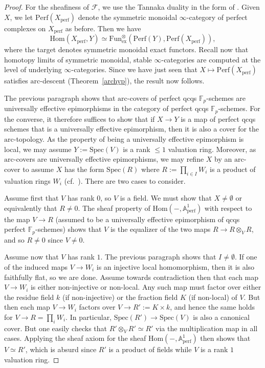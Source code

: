\documentclass[reqno]{amsart}
\newcommand{\sF}{\mathcal{F}}
\newcommand{\spec}{\mathrm{Spec}}
\newcommand{\arc}{\mathrm{arc}}
\renewcommand{\hom}{\mathrm{Hom}}
\theoremstyle{definition}
\begin{document}
\begin{proof} 
\newcommand{\perf}{\mathrm{Perf}}
\newcommand{\fun}{\mathrm{Fun}}
For the sheafiness of $\sF$, we use the Tannaka duality in the form of \cite[Theorem 1.5]{B}. Given $X$, we let $\perf(X_{\mathrm{perf}})$ denote the symmetric monoidal $\infty$-category of perfect complexes on $X_{\mathrm{perf}}$ as before. Then  we have  
\[ \hom( X_{\mathrm{perf}}, Y) \simeq \fun^{\otimes}_{\mathrm{ex}}(\perf(Y), \perf(X_{\mathrm{perf}})),  \]
where the target denotes symmetric monoidal exact functors.  
Recall now that homotopy limits of symmetric monoidal, stable $\infty$-categories
are computed at the level of underlying $\infty$-categories. 
Since we have just
seen that $X \mapsto \perf(X_{\mathrm{perf}})$ satisfies $\arc$-descent
(Theorem~\ref{archyp}),  the result now follows. 


The previous paragraph shows that $\arc$-covers of perfect qcqs
$\mathbb{F}_p$-schemes are universally effective epimorphisms 
in the category of perfect qcqs $\mathbb{F}_p$-schemes. For the converse,
it therefore suffices to show that if $X \to Y$ is a map of perfect qcqs schemes
that is a universally effective epimorphism, then it is also a cover for the
$\arc$-topology. As the property of being a universally effective epimorphism is
local, we may assume $Y := \mathrm{Spec}(V)$ is a rank $\leq 1$ valuation ring.
Moreover, as $\arc$-covers are universally effective epimorphisms, we may 
refine $X$ by an $\arc$-cover to assume $X$ has the form $\mathrm{Spec}(R)$
where $R := \prod_{i \in I} W_i$  is a product of  valuation rings
$W_i$ (cf.~). 
There are two cases to consider. 

Assume first that $V$ has rank $0$, so $V$ is a field. We must show that $X \neq
\emptyset$ or equivalently that $R \neq 0$. The sheaf property of
$\mathrm{Hom}(-, \mathbb{A}^1_{\mathrm{perf}})$ with respect to the map $V \to
R$ (assumed to be a universally effective epimorphism of qcqs perfect
$\mathbb{F}_p$-schemes) shows that $V$ is the equalizer of the two maps $R \to R \otimes_V R$, and so $R \neq 0$ since $V \neq 0$.

Assume now that $V$ has rank $1$. The previous paragraph shows that $I \neq
\emptyset$.  If one of the induced maps $V \to W_i$ is an injective local
homomorphism, then it is also faithfully flat, so we are done. Assume towards
contradiction then that each map $V \to W_i$ is either non-injective or
non-local. Any such map must factor over either the residue field $k$ (if
non-injective) or the fraction field $K$ (if non-local) of $V$. But then each map $V \to W_i$ factors over $V \to R' := K \times k$, and hence the same holds for $V \to R = \prod_i W_i$. In particular, $\spec(R') \to \spec(V)$ is also a canonical cover. But one easily checks that $R' \otimes_V R' \simeq R'$ via the multiplication map in all cases. Applying the sheaf axiom for the sheaf $\mathrm{Hom}(-, \mathbb{A}^1_{\mathrm{perf}})$ then shows that $V \simeq R'$, which is absurd since $R'$ is a product of fields while $V$ is a rank $1$ valuation ring.
\end{proof}
\end{document}
